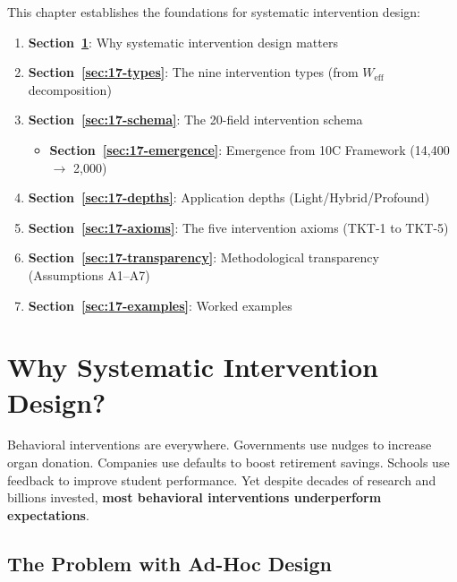 \begin{tcolorbox}[colback=green!5!white, colframe=green!75!black,
    title=Chapter Overview]

This chapter establishes the foundations for systematic intervention design:

\begin{enumerate}
\item \textbf{Section~\ref{sec:17-why}}: Why systematic intervention design matters
\item \textbf{Section~\ref{sec:17-types}}: The nine intervention types (from $W_{\text{eff}}$ decomposition)
\item \textbf{Section~\ref{sec:17-schema}}: The 20-field intervention schema
    \begin{itemize}[nosep]
    \item \textbf{Section~\ref{sec:17-emergence}}: Emergence from 10C Framework (14,400 $\rightarrow$ 2,000)
    \end{itemize}
\item \textbf{Section~\ref{sec:17-depths}}: Application depths (Light/Hybrid/Profound)
\item \textbf{Section~\ref{sec:17-axioms}}: The five intervention axioms (TKT-1 to TKT-5)
\item \textbf{Section~\ref{sec:17-transparency}}: Methodological transparency (Assumptions A1--A7)
\item \textbf{Section~\ref{sec:17-examples}}: Worked examples
\end{enumerate}
\end{tcolorbox}


\section{Why Systematic Intervention Design?}
\label{sec:17-why}

Behavioral interventions are everywhere. Governments use nudges to increase organ donation. Companies use defaults to boost retirement savings. Schools use feedback to improve student performance. Yet despite decades of research and billions invested, \textbf{most behavioral interventions underperform expectations}.

\subsection{The Problem with Ad-Hoc Design}


